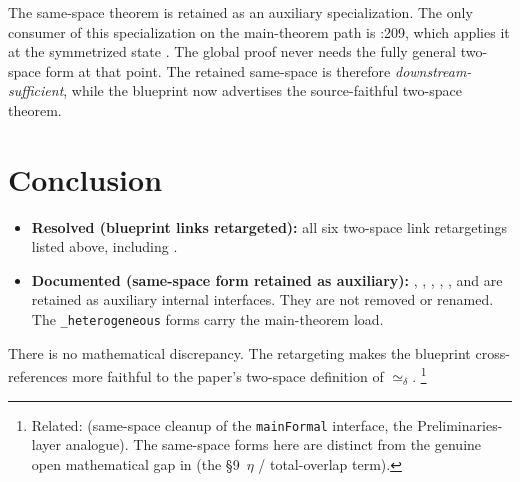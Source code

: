\documentclass[11pt]{article}
\begin{document}
The same-space theorem  is retained as an auxiliary
specialization.  The only consumer of this specialization on the main-theorem path is
:209, which applies it at the symmetrized state
.  The global proof never needs
the fully general two-space form at that point.  The retained same-space
 is therefore \emph{downstream-sufficient}, while the
blueprint now advertises the source-faithful two-space theorem.

\section{Conclusion}

\begin{itemize}
  \item \textbf{Resolved (blueprint links retargeted):} all six
  two-space link retargetings listed above, including
  .
  \item \textbf{Documented (same-space form retained as auxiliary):}
  , ,
  , ,
  , and  are retained as
  auxiliary internal interfaces.  They are not removed or renamed.  The
  \verb|_heterogeneous| forms carry the main-theorem load.
\end{itemize}

There is no mathematical discrepancy.  The retargeting makes the blueprint
cross-references more faithful to the paper's two-space definition of
\(\simeq_\delta\).%
\footnote{Related:  (same-space cleanup of the \texttt{mainFormal}
interface, the Preliminaries-layer analogue).  The same-space forms here are
distinct from the genuine open mathematical gap in  (the
\S9~\(\eta\) / total-overlap term).}



\end{document}
